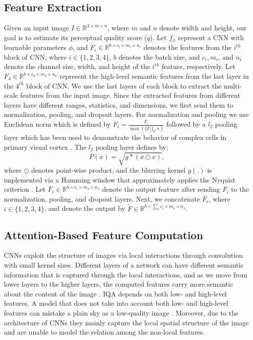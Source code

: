 \documentclass[10pt,twocolumn,letterpaper]{article}
\begin{document}
\subsection{Feature Extraction}\label{S3.1}
Given an input image $I\in \mathbb{R}^{3\times m\times n}$, where $m$ and $n$ denote width and height, our goal is to estimate its perceptual quality score ($q$). 
Let $f_{\phi}$ represent a CNN  with learnable parameters $\phi$, and  $F_{i}\in\mathbb{R}^{b\times c_{i}\times m_{i}\times n_{i}}$ denotes the features from the $i^{th}$ block of CNN, where  $i\in\{1,2,3,4\}$,  $b$ denotes the batch size, and $c_{i}, m_{i}$, and $ n_{i}$ denote the  channel size, width, and height of the $i^{th}$ feature, respectively.
Let $F_{4}\in\mathbb{R}^{b\times c_{4}\times m_{4}\times n_{4}}$ represent  the high-level semantic features from the last layer in the $4^{th}$ block of CNN.
We use the last layers of each block to extract the multi-scale features from the input image.
Since the extracted features from different layers have different ranges, statistics, and dimensions,   we first send them to normalization, pooling, and dropout layers.
For normalization and pooling we use Euclidean norm which is defined by $F_{i}=\frac{F_{i}}{\max(\left\Vert F_{i}\right\Vert _{2},\epsilon)}$ followed by a $\mathit{l}_2$ pooling layer   \cite{henaff2015geodesics,ding2020image} which has been used to demonstrate the behavior of complex cells in primary 
visual cortex \cite{bruna2013invariant,vintch2015convolutional}.
The $\mathit{l}_2$ pooling layer defines by:
\begin{equation}
P(x)=\sqrt{g\ast(x\odot x)},
\end{equation}
where $\odot$ denotes point-wise product, and the blurring kernel
$g(.)$ is implemented via a Hamming window that approximately applies the Nyquist criterion \cite{ding2020image}.
Let $\bar{F}_{i}\in\mathbb{R}^{b\times c_{i}\times m_{4}\times n_{4}}$ denote the output feature after sending $F_i$  to the normalization, pooling, and dropout layers.
Next, we  concatenate $\bar{F}_{i}$, where $i\in \{1,2,3,4\}$, and  denote  the output by $
\tilde{F}\in\mathbb{R}^{b\times\sum_{i}c_{i}\times m_{4}\times n_{4}}$.


\subsection{Attention-Based Feature Computation}
\label{S3.2}
CNNs exploit  the structure of images via local interactions through convolution with small kernel sizes. 
Different layers of a network can have different semantic information that is   captured through the local interactions,  and as we move from lower layers to the higher layers, the computed features carry more semantic about the content of the image \cite{zeiler2014visualizing}.
IQA depends on both low- and high-level features. 
A model that does not take into account both low- and high-level features  can  mistake a plain sky as a low-quality image \cite{li2018has}.
Moreover, due to the architecture of CNNs   they mainly capture the local spatial structure of the image and are unable to  model the relation  among  the  non-local features. 
\end{document}
